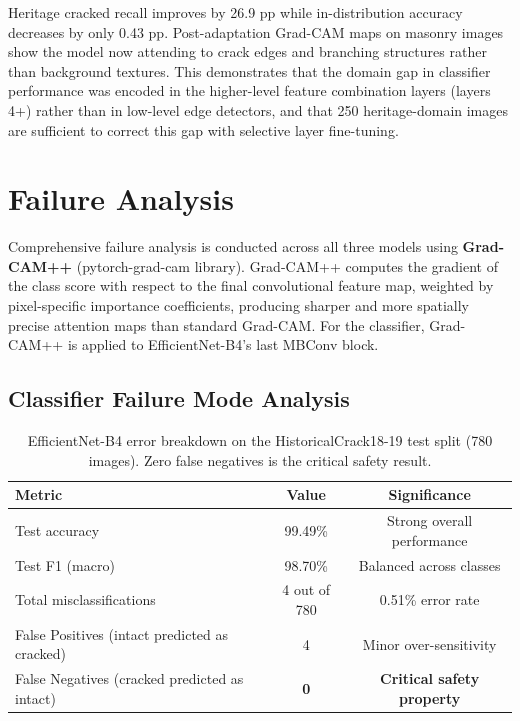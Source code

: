 \documentclass[12pt,a4paper]{article}
\begin{document}
Heritage cracked recall improves by 26.9 pp while in-distribution accuracy decreases by only 0.43 pp. Post-adaptation Grad-CAM maps on masonry images show the model now attending to crack edges and branching structures rather than background textures. This demonstrates that the domain gap in classifier performance was encoded in the higher-level feature combination layers (layers 4+) rather than in low-level edge detectors, and that 250 heritage-domain images are sufficient to correct this gap with selective layer fine-tuning.

\clearpage
\section{Failure Analysis}
\label{sec:failure}

Comprehensive failure analysis is conducted across all three models using \textbf{Grad-CAM++} (pytorch-grad-cam library). Grad-CAM++ computes the gradient of the class score with respect to the final convolutional feature map, weighted by pixel-specific importance coefficients, producing sharper and more spatially precise attention maps than standard Grad-CAM. For the classifier, Grad-CAM++ is applied to EfficientNet-B4's last MBConv block.

\subsection{Classifier Failure Mode Analysis}

\begin{table}[H]
\centering
\caption{EfficientNet-B4 error breakdown on the HistoricalCrack18-19 test split (780 images). Zero false negatives is the critical safety result.}
\label{tab:cls_errors}
\begin{tabular}{lcc}
\toprule
\rowcolor{white}
\textbf{Metric} & \textbf{Value} & \textbf{Significance} \\
\midrule
Test accuracy & 99.49\% & Strong overall performance \\
Test F1 (macro) & 98.70\% & Balanced across classes \\
Total misclassifications & 4 out of 780 & 0.51\% error rate \\
False Positives (intact predicted as cracked) & 4 & Minor over-sensitivity \\
False Negatives (cracked predicted as intact) & \textbf{0} & \textbf{Critical safety property} \\
\bottomrule
\end{tabular}
\end{table}
\end{document}
